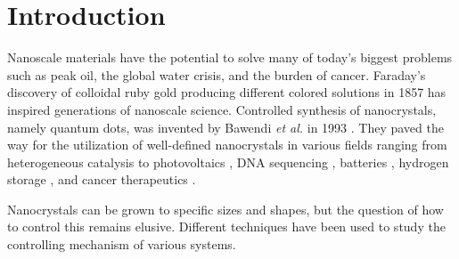 
\section{Introduction}


Nanoscale materials have the potential to solve many of today's biggest problems such as peak oil, the global water crisis, and the burden of cancer.
Faraday's discovery of colloidal ruby gold producing different colored solutions in 1857 \cite{Faraday_1857,Thompson_2007} has inspired generations of nanoscale science.
Controlled synthesis of nanocrystals, namely quantum dots, was invented by Bawendi \textit{et al.} in 1993 \cite{hakimi1993quantum,Murray_2000}.
They paved the way for the utilization of well-defined nanocrystals in various fields ranging from heterogeneous catalysis \cite{astruc2008nanoparticles,Astruc_2006} to photovoltaics \cite{Atwater_2010}, DNA sequencing \cite{McNally_2010}, batteries \cite{Panniello_2014}, hydrogen storage \cite{Jena_2011,Ramos_Castillo_2015}, and cancer therapeutics \cite{Jain_2010,Kim_2010}.


Nanocrystals can be grown to specific sizes and shapes, but the question of how to control this remains elusive.
Different techniques have been used to study the controlling mechanism of various systems.



  